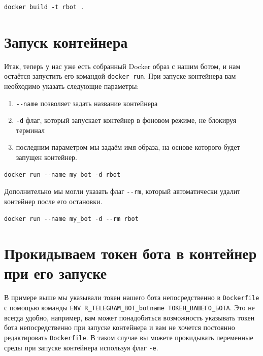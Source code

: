 \documentclass[
]{book}
\providecommand{\tightlist}{%
  \setlength{\itemsep}{0pt}\setlength{\parskip}{0pt}}
\begin{document}
\begin{verbatim}
docker build -t rbot .
\end{verbatim}

\section{Запуск контейнера}\label{ux437ux430ux43fux443ux441ux43a-ux43aux43eux43dux442ux435ux439ux43dux435ux440ux430}

Итак, теперь у нас уже есть собранный Docker образ с нашим ботом, и нам остаётся запустить его командой \texttt{docker\ run}. При запуске контейнера вам необходимо указать следующие параметры:

\begin{enumerate}
\def\labelenumi{\arabic{enumi}.}
\tightlist
\item
  \texttt{-\/-name} позволяет задать название контейнера
\item
  \texttt{-d} флаг, который запускает контейнер в фоновом режиме, не блокируя терминал
\item
  последним параметром мы задаём имя образа, на основе которого будет запущен контейнер.
\end{enumerate}

\begin{verbatim}
docker run --name my_bot -d rbot
\end{verbatim}

Дополнительно мы могли указать флаг \texttt{-\/-rm}, который автоматически удалит контейнер после его остановки.

\begin{verbatim}
docker run --name my_bot -d --rm rbot
\end{verbatim}

\section{Прокидываем токен бота в контейнер при его запуске}\label{ux43fux440ux43eux43aux438ux434ux44bux432ux430ux435ux43c-ux442ux43eux43aux435ux43d-ux431ux43eux442ux430-ux432-ux43aux43eux43dux442ux435ux439ux43dux435ux440-ux43fux440ux438-ux435ux433ux43e-ux437ux430ux43fux443ux441ux43aux435}

В примере выше мы указывали токен нашего бота непосредственно в \texttt{Dockerfile} с помощью команды \texttt{ENV\ R\_TELEGRAM\_BOT\_botname\ ТОКЕН\_ВАШЕГО\_БОТА}. Это не всегда удобно, например, вам может понадобиться возможность указывать токен бота непосредственно при запуске контейнера и вам не хочется постоянно редактировать \texttt{Dockerfile}. В таком случае вы можете прокидывать переменные среды при запуске контейнера используя флаг \texttt{-e}.
\end{document}

